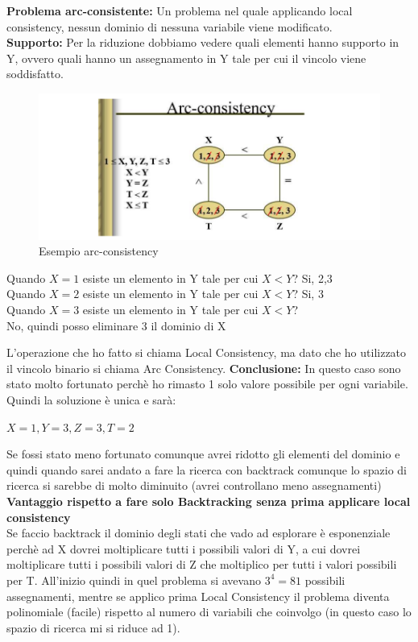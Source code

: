 \textbf{Problema arc-consistente:} Un problema nel quale applicando local consistency, nessun dominio di nessuna variabile viene modificato.
\\
\textbf{Supporto:} Per la riduzione dobbiamo vedere quali elementi hanno supporto in Y, ovvero quali hanno un assegnamento in Y tale per cui il vincolo viene soddisfatto.
\begin{figure}[htp]
	\centering
    \includegraphics[width=13cm, keepaspectratio]{img/Cap3/esempio-arc.png}
    \caption{Esempio arc-consistency}
\end{figure}
\begin{center}
    Quando $X=1$ esiste un elemento in Y tale per cui $X < Y$? Si, 2,3
    \\Quando $X=2$ esiste un elemento in Y tale per cui $X < Y$? Si, 3
    \\Quando $X=3$ esiste un elemento in Y tale per cui $X < Y$?
    \\No, quindi posso eliminare 3 il dominio di X    
\end{center}
L’operazione che ho fatto si chiama Local Consistency, ma dato che ho utilizzato il vincolo binario si chiama Arc Consistency.
\newpage
\textbf{Conclusione:} In questo caso sono stato molto fortunato perchè ho rimasto 1 solo valore possibile per ogni variabile. Quindi la soluzione è unica e sarà:
\begin{center}
    $X = 1, Y = 3, Z = 3, T = 2$
\end{center}
Se fossi stato meno fortunato comunque avrei ridotto gli elementi del dominio e quindi quando sarei andato a fare la ricerca con backtrack comunque lo spazio di ricerca si sarebbe di molto diminuito (avrei controllano meno assegnamenti)
\vspace{0.3cm}
\\\textbf{Vantaggio rispetto a fare solo Backtracking senza prima applicare local consistency}
\\Se faccio backtrack il dominio degli stati che vado ad esplorare è esponenziale perchè ad X dovrei moltiplicare tutti i possibili valori di Y, a cui dovrei moltiplicare tutti i possibili valori di Z che moltiplico per tutti i valori possibili per T. All’inizio quindi in quel problema si avevano $3^4 = 81$ possibili assegnamenti, mentre se applico prima Local Consistency il problema diventa polinomiale (facile) rispetto al numero di variabili che coinvolgo (in questo caso lo spazio di ricerca mi si riduce ad 1).
